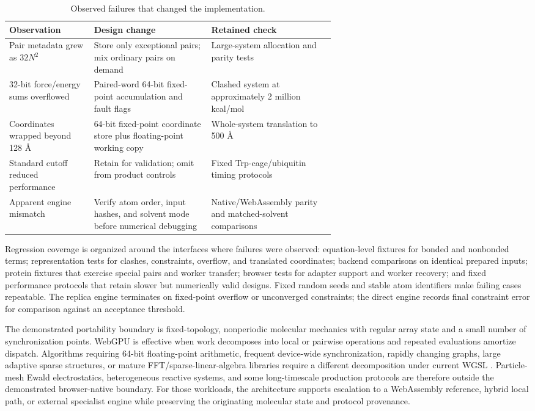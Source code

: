 \documentclass[11pt]{article}
\begin{document}
\begin{small}
\begin{table}[htbp]
\centering\small
\caption{Observed failures that changed the implementation.}
\label{tab:appA_failures}
\begin{tabularx}{\linewidth}{@{}p{0.26\linewidth}p{0.36\linewidth}X@{}}
\toprule
\textbf{Observation} & \textbf{Design change} & \textbf{Retained check}\\
\midrule
Pair metadata grew as $32N^2$ & Store only exceptional pairs; mix ordinary pairs on demand & Large-system allocation and parity tests\\
32-bit force/energy sums overflowed & Paired-word 64-bit fixed-point accumulation and fault flags & Clashed system at approximately 2 million kcal/mol\\
Coordinates wrapped beyond 128 \AA{} & 64-bit fixed-point coordinate store plus floating-point working copy & Whole-system translation to 500 \AA{}\\
Standard cutoff reduced performance & Retain for validation; omit from product controls & Fixed Trp-cage/ubiquitin timing protocols\\
Apparent engine mismatch & Verify atom order, input hashes, and solvent mode before numerical debugging & Native/WebAssembly parity and matched-solvent comparisons\\
\bottomrule
\end{tabularx}
\end{table}

Regression coverage is organized around the interfaces where failures were observed: equation-level fixtures for bonded and nonbonded terms; representation tests for clashes, constraints, overflow, and translated coordinates; backend comparisons on identical prepared inputs; protein fixtures that exercise special pairs and worker transfer; browser tests for adapter support and worker recovery; and fixed performance protocols that retain slower but numerically valid designs. Fixed random seeds and stable atom identifiers make failing cases repeatable. The replica engine terminates on fixed-point overflow or unconverged constraints; the direct engine records final constraint error for comparison against an acceptance threshold.

The demonstrated portability boundary is fixed-topology, nonperiodic molecular mechanics with regular array state and a small number of synchronization points. WebGPU is effective when work decomposes into local or pairwise operations and repeated evaluations amortize dispatch. Algorithms requiring 64-bit floating-point arithmetic, frequent device-wide synchronization, rapidly changing graphs, large adaptive sparse structures, or mature FFT/sparse-linear-algebra libraries require a different decomposition under current WGSL \citep{webgpuWGSL2026}. Particle-mesh Ewald electrostatics, heterogeneous reactive systems, and some long-timescale production protocols are therefore outside the demonstrated browser-native boundary. For those workloads, the architecture supports escalation to a WebAssembly reference, hybrid local path, or external specialist engine while preserving the originating molecular state and protocol provenance.


\end{small}
\end{document}
